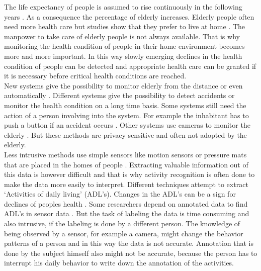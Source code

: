 % 

The life expectancy of people is assumed to rise continuously in the following years \cite{UnitedNations}. As a consequence the percentage of elderly increases. Elderly people often need more health care but studies show that they prefer to live at home \cite{Cavallo:1315167}. The manpower to take care of elderly people is not always available. That is why monitoring the health condition of people in their home environment becomes more and more important. In this way slowly emerging declines in the health condition of people can be detected and appropriate health care can be granted if it is necessary before critical health conditions are reached.\\

New systems give the possibility to monitor elderly from the distance or even automatically \cite{Tamura1998573}. Different systems give the possibility to detect accidents or monitor the health condition on a long time basis. Some systems still need the action of a person involving into the system. For example the inhabitant has to push a button if an accident occurs \cite{Kwon20125774}. Other systems use cameras to monitor the elderly \cite{Mubashir2013144,Nagai2010204}. But these methods are privacy-sensitive and often not adopted by the elderly.\\

Less intrusive methods use simple sensors like motion sensors or pressure mats that are placed in the homes of people \cite{Tapia04activityrecognition,4912776}. Extracting valuable information out of this data is however difficult and that is why activity recognition is often done to make the data more easily to interpret. Different techniques attempt to extract `Activities of daily living' (ADL's). Changes in the ADL's can be a sign for declines of peoples health \cite{Tapia04activityrecognition}.
Some researchers depend on annotated data to find ADL's in sensor data \cite{Tapia04activityrecognition,Hong2009236,Wilson:2005:STA:2154273.2154280}. But the task of labeling the data is time consuming and also intrusive, if the labeling is done by a different person. The knowledge of being observed by a sensor, for example a camera, might change the behavior patterns of a person and in this way the data is not accurate. Annotation that is done by the subject himself also might not be accurate, because the person has to interrupt his daily behavior to write down the annotation of the activities.\\

